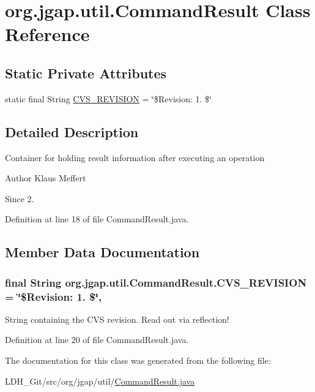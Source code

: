 \hypertarget{classorg_1_1jgap_1_1util_1_1_command_result}{\section{org.\-jgap.\-util.\-Command\-Result Class Reference}
\label{classorg_1_1jgap_1_1util_1_1_command_result}
}
\subsection*{Static Private Attributes}
\begin{DoxyCompactItemize}
\item 
static final String \hyperlink{classorg_1_1jgap_1_1util_1_1_command_result_a49db5eebb4416c57ce627cc389af9feb}{C\-V\-S\-\_\-\-R\-E\-V\-I\-S\-I\-O\-N} = \char`\"{}\$Revision\-: 1. \$\char`\"{}
\end{DoxyCompactItemize}


\subsection{Detailed Description}
Container for holding result information after executing an operation

\begin{DoxyAuthor}{Author}
Klaus Meffert 
\end{DoxyAuthor}
\begin{DoxySince}{Since}
2. 
\end{DoxySince}


Definition at line 18 of file Command\-Result.\-java.



\subsection{Member Data Documentation}
\hypertarget{classorg_1_1jgap_1_1util_1_1_command_result_a49db5eebb4416c57ce627cc389af9feb}{
\subsubsection[{C\-V\-S\-\_\-\-R\-E\-V\-I\-S\-I\-O\-N}]{\setlength{\rightskip}{0pt plus 5cm}final String org.\-jgap.\-util.\-Command\-Result.\-C\-V\-S\-\_\-\-R\-E\-V\-I\-S\-I\-O\-N = \char`\"{}\$Revision\-: 1. \$\char`\"{}\hspace{0.3cm}{\ttfamily [static]}, {\ttfamily [private]}}}\label{classorg_1_1jgap_1_1util_1_1_command_result_a49db5eebb4416c57ce627cc389af9feb}
String containing the C\-V\-S revision. Read out via reflection! 

Definition at line 20 of file Command\-Result.\-java.



The documentation for this class was generated from the following file\-:\begin{DoxyCompactItemize}
\item 
L\-D\-H\-\_\-\-Git/src/org/jgap/util/\hyperlink{_command_result_8java}{Command\-Result.\-java}\end{DoxyCompactItemize}
